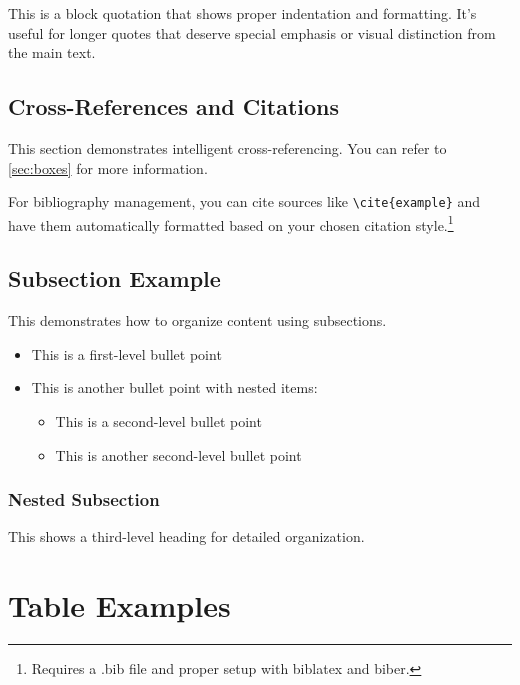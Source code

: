 \documentclass[a4paper,11pt]{article}
\begin{document}
\begin{displayquote}
This is a block quotation that shows proper indentation and formatting. It's useful for longer quotes that deserve special emphasis or visual distinction from the main text.
\end{displayquote}

\subsection{Cross-References and Citations}

This section demonstrates intelligent cross-referencing. You can refer to \vref{sec:boxes} for more information.

For bibliography management, you can cite sources like \texttt{\textbackslash cite\{example\}} and have them automatically formatted based on your chosen citation style.\footnote{Requires a .bib file and proper setup with biblatex and biber.}

\subsection{Subsection Example}

This demonstrates how to organize content using subsections.

\begin{itemize}
    \item This is a first-level bullet point
    \item This is another bullet point with nested items:
    \begin{itemize}
        \item This is a second-level bullet point
        \item This is another second-level bullet point
    \end{itemize}
\end{itemize}

\subsubsection{Nested Subsection}

This shows a third-level heading for detailed organization.

\section{Table Examples}
\end{document}
